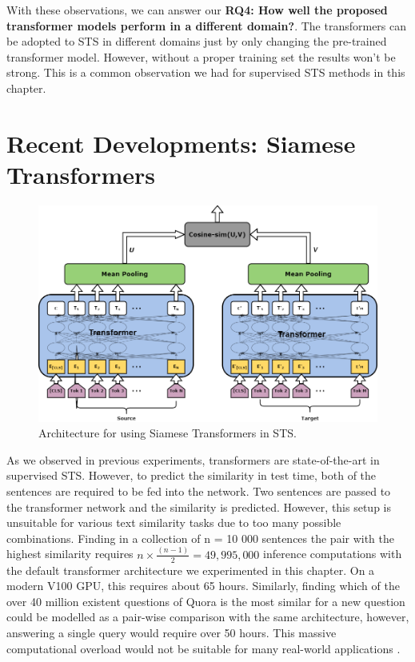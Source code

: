With these observations, we can answer our \textbf{RQ4: How well the proposed transformer models perform in a different domain?}. The transformers can be adopted to STS in different domains just by only changing the pre-trained transformer model. However, without a proper training set the results won't be strong. This is a common observation we had for supervised STS methods in this chapter.

\section{Recent Developments: Siamese Transformers}
\label{sec:transformer_siamese}

\begin{figure}[ht]
	\centering
	\includegraphics[scale=0.35]{figures/semantic_textual_similarity/transformers/sentence-bert.png}
	\caption[Architecture for using Siamese Transformers in STS]{Architecture for using Siamese Transformers in STS.}
	\label{fig:siamese_transformers}
\end{figure}

As we observed in previous experiments, transformers are state-of-the-art in supervised STS. However, to predict the similarity in test time, both of the sentences are required to be fed into the network. Two sentences are passed to the transformer network
and the similarity is predicted. However, this setup is unsuitable for various text similarity tasks due to too many possible combinations. Finding in a collection of n = 10 000 sentences the pair with the highest similarity requires $n \times \frac {(n-1)}{2} = 49,995,000$ inference computations with the default transformer architecture we experimented in this chapter. On a modern V100 GPU, this requires about 65 hours. Similarly, finding which of the over 40 million existent questions of Quora is the most similar for a new question could be modelled as a pair-wise comparison with the same architecture, however, answering a single query would require over 50 hours. This massive computational overload would not be suitable for many real-world applications \autocite{reimers-gurevych-2019-sentence}.


